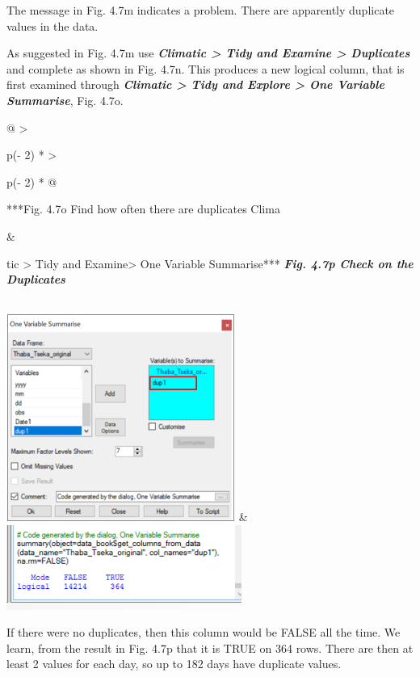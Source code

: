 \documentclass[
  letterpaper,
  DIV=11,
  numbers=noendperiod]{scrreprt}
\begin{document}
The message in Fig. 4.7m indicates a problem. There are apparently
duplicate values in the data.

As suggested in Fig. 4.7m use \textbf{\emph{Climatic \textgreater{} Tidy
and Examine \textgreater{} Duplicates}} and complete as shown in Fig.
4.7n. This produces a new logical column, that is first examined through
\textbf{\emph{Climatic \textgreater{} Tidy and Explore \textgreater{}
One Variable Summarise}}, Fig. 4.7o.

\begin{longtable}[]{@{}
  >{\raggedright\arraybackslash}p{(\columnwidth - 2\tabcolsep) * }
  >{\raggedright\arraybackslash}p{(\columnwidth - 2\tabcolsep) * }@{}}
\toprule\noalign{}
\begin{minipage}[b]{\linewidth}\raggedright
***Fig. 4.7o Find how often there are duplicates Clima
\end{minipage} & \begin{minipage}[b]{\linewidth}\raggedright
tic \textgreater{} Tidy and Examine\textgreater{} One Variable
Summarise*** \textbf{\emph{Fig. 4.7p Check on the Duplicates}}
\end{minipage} \\
\midrule\noalign{}
\endhead
\bottomrule\noalign{}
\endlastfoot
\includegraphics[width=2.94966in,height=2.66714in]{figures/Fig4.7o.png}
&
\includegraphics[width=3.03407in,height=1.09115in]{figures/Fig4.7p.png} \\
\end{longtable}

If there were no duplicates, then this column would be FALSE all the
time. We learn, from the result in Fig. 4.7p that it is TRUE on 364
rows. There are then at least 2 values for each day, so up to 182 days
have duplicate values.
\end{document}
